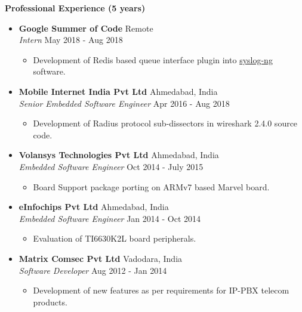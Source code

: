 \documentclass[letterpaper,11pt]{article}
\newcommand{\resitem}[1]{\item #1 \vspace{-2pt}}
\newcommand{\resheading}[1]{{\large \colorbox{mygrey}{\begin{minipage}{\textwidth}{\textbf{#1 \vphantom{p\^{E}}}}\end{minipage}}}}
\begin{document}
\resheading{Professional Experience (5 years)}
\begin{itemize}

\item
	\textbf{Google Summer of Code} 
	\hfill{Remote}\\
	\textit{Intern} \hfill{May 2018 - Aug 2018}
	\begin{itemize} \vspace{-2mm}
		\resitem{Development of Redis based queue interface plugin into \href{https://github.com/mehul-m-prajapati/gsoc-queue-interface}{syslog-ng} software.}
	\end{itemize}

\item
	\textbf{Mobile Internet India Pvt Ltd} \hfill{Ahmedabad, India}\\
	\textit{Senior Embedded Software Engineer} \hfill{Apr 2016 - Aug 2018}
	\begin{itemize} \vspace{-2mm}
		\resitem{Development of Radius protocol sub-dissectors in wireshark 2.4.0 source code.}
	\end{itemize}

\item
	\textbf{Volansys Technologies Pvt Ltd}
	\hfill{Ahmedabad, India}\\ 
	\textit{Embedded Software Engineer}
	\hfill{Oct 2014 - July 2015}\\
	\begin{itemize} \vspace{-2mm}
		\resitem{Board Support package porting on ARMv7 based Marvel board.}
	\end{itemize}

\item
	\textbf{eInfochips Pvt Ltd} 
	\hfill{Ahmedabad, India}\\
	\textit{Embedded Software Engineer} \hfill{Jan 2014 - Oct 2014}\\
	\begin{itemize} \vspace{-2mm}
		\resitem{Evaluation of TI6630K2L board peripherals.}
	\end{itemize}

\item
	\textbf{Matrix Comsec Pvt Ltd} 
	\hfill{Vadodara, India}\\
	\textit{Software Developer} \hfill{Aug 2012 - Jan 2014}\\
	\begin{itemize} \vspace{-2mm}
		\resitem{Development of new features as per requirements for IP-PBX telecom products.}
	\end{itemize}

\end{itemize}
\end{document}
